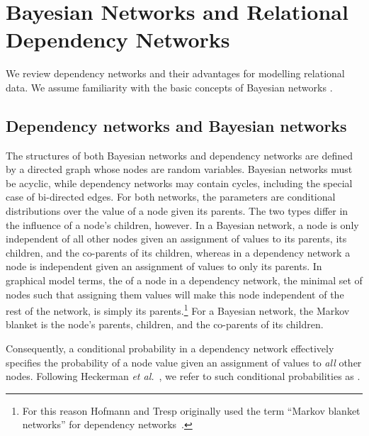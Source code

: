 \documentclass[runningheads,a4paper]{llncs}
\newcommand{\etal}{\textit{et al.}}
\begin{document}
%  
 \section{Bayesian Networks and Relational Dependency Networks} We review dependency networks and their advantages for modelling relational data. We assume familiarity with the basic concepts of Bayesian networks \cite{Pearl1988}. 
 \subsection{Dependency networks and Bayesian networks} The structures of both Bayesian networks and dependency networks are defined by a directed graph whose nodes are random variables. Bayesian networks must be acyclic, while dependency networks may contain cycles, including the special case of bi-directed edges. For both networks, the parameters are conditional distributions over the value of a node given its parents. The two types differ in the  influence of a node's children, however. In a Bayesian network, a node is only independent of all other nodes given an assignment of values to its parents, its children, and the co-parents of its children, whereas in a dependency network a node is independent given an assignment of values to only its parents. In graphical model terms, the  of a node in a dependency network, the minimal set of nodes such that assigning them values will make this node independent of the rest of the network, is simply its parents.\footnote{For this reason Hofmann and Tresp originally used the term ``Markov blanket networks'' for dependency networks~\cite{Hofmann1998}.}
For a Bayesian network, the Markov blanket is the node's parents, children, and the co-parents of its children.

Consequently, a conditional probability in a dependency network effectively specifies the probability of a node value given an assignment of values to {\em all} other nodes. 
Following Heckerman \etal{}~\cite{Heckerman2000}, we refer to such conditional probabilities as .
\end{document}

